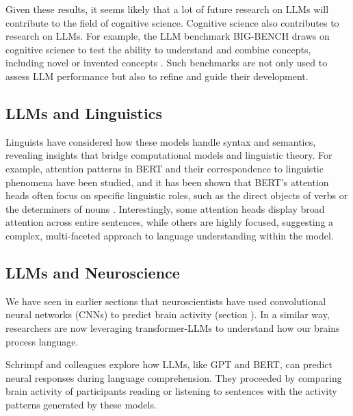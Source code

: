Given these results, it seems likely that a lot of future research on LLMs will contribute to the field of cognitive science. Cognitive science also contributes to research on LLMs. For example, the LLM benchmark BIG-BENCH draws on cognitive science to test the ability to understand and combine concepts, including novel or invented concepts \cite{srivastava2022beyond}. Such benchmarks are not only used to assess LLM performance but also to refine and guide their development. 

\subsection{LLMs and Linguistics}

Linguists have considered how these models handle syntax and semantics, revealing insights that bridge computational models and linguistic theory. For example, attention patterns in BERT and their correspondence to linguistic phenomena have been studied, and it has been shown that BERT's attention heads often focus on specific linguistic roles, such as the direct objects of verbs or the determiners of nouns \cite{clark2019does}. Interestingly, some attention heads display broad attention across entire sentences, while others are highly focused, suggesting a complex, multi-faceted approach to language understanding within the model. 

\subsection{LLMs and Neuroscience}


We have seen in earlier sections that neuroscientists have used convolutional neural networks (CNNs) to predict brain activity (section ). In a similar way, researchers are now leveraging transformer-LLMs to understand how our brains process language. 

Schrimpf and colleagues \cite{schrimpf2021neural} explore how LLMs, like GPT and BERT, can predict neural responses during language comprehension. They proceeded by comparing brain activity of participants reading or listening to sentences with the activity patterns generated by these models. 

